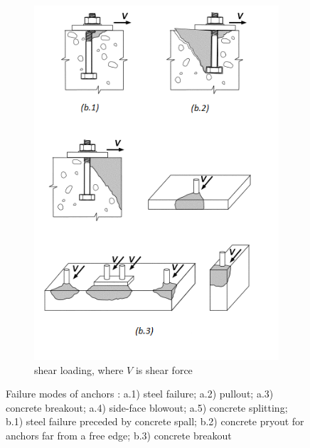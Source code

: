 \begin{figure}
\begin{subfigure}{.5\textwidth}
		\label{obr:tensile_loaded}
	\end{subfigure}%
	\begin{subfigure}{.5\textwidth}
		\centering
		\includegraphics[width=.9\linewidth]{obrazky/failure_models_shear.png}
		\caption{shear loading, where $V$ is shear force}
		\label{obr:shear_loaded}
	\end{subfigure}
	\caption[Failure modes of anchors]{Failure modes of anchors \cite{anchors-ACI-318M}: a.1) steel failure; a.2) pullout; a.3) concrete breakout; a.4) side-face blowout; a.5) concrete splitting; b.1) steel failure preceded by concrete spall; b.2) concrete pryout for anchors far from a free edge; b.3) concrete breakout}
	\label{obr:failture_models}
\end{figure}


